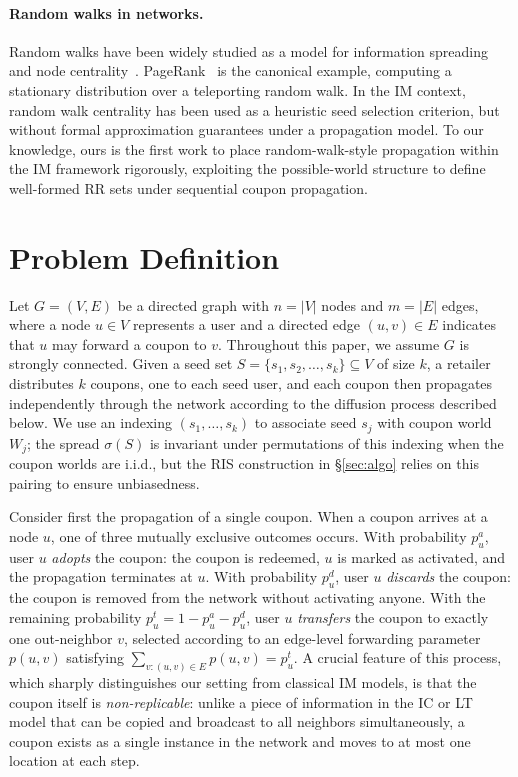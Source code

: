 \documentclass[sigconf]{acmart}
\begin{document}
\paragraph{Random walks in networks.}
Random walks have been widely studied as a model for information spreading and node centrality~\cite{lovasz1993random}. PageRank~\cite{page1999pagerank} is the canonical example, computing a stationary distribution over a teleporting random walk. In the IM context, random walk centrality has been used as a heuristic seed selection criterion, but without formal approximation guarantees under a propagation model. To our knowledge, ours is the first work to place random-walk-style propagation within the IM framework rigorously, exploiting the possible-world structure to define well-formed RR sets under sequential coupon propagation.

\section{Problem Definition}

Let $G = (V, E)$ be a directed graph with $n = |V|$ nodes and $m = |E|$ edges, where a node $u \in V$ represents a user and a directed edge $(u, v) \in E$ indicates that $u$ may forward a coupon to $v$. Throughout this paper, we assume $G$ is strongly connected. Given a seed set $S = \{s_1, s_2, \ldots, s_k\} \subseteq V$ of size $k$, a retailer distributes $k$ coupons, one to each seed user, and each coupon then propagates independently through the network according to the diffusion process described below. We use an indexing $(s_1,\ldots,s_k)$ to associate seed $s_j$ with coupon world $W_j$; the spread $\sigma(S)$ is invariant under permutations of this indexing when the coupon worlds are i.i.d., but the RIS construction in \S\ref{sec:algo} relies on this pairing to ensure unbiasedness.

Consider first the propagation of a single coupon. When a coupon arrives at a node $u$, one of three mutually exclusive outcomes occurs. With probability $p_u^a$, user $u$ \emph{adopts} the coupon: the coupon is redeemed, $u$ is marked as activated, and the propagation terminates at $u$. With probability $p_u^d$, user $u$ \emph{discards} the coupon: the coupon is removed from the network without activating anyone. With the remaining probability $p_u^t = 1 - p_u^a - p_u^d$, user $u$ \emph{transfers} the coupon to exactly one out-neighbor $v$, selected according to an edge-level forwarding parameter $p(u, v)$ satisfying $\sum_{v: (u, v) \in E} p(u, v) = p_u^t$. A crucial feature of this process, which sharply distinguishes our setting from classical IM models, is that the coupon itself is \emph{non-replicable}: unlike a piece of information in the IC or LT model that can be copied and broadcast to all neighbors simultaneously, a coupon exists as a single instance in the network and moves to at most one location at each step.
\end{document}
